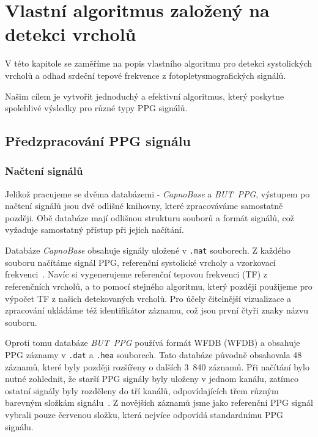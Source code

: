 \chapter{Vlastní algoritmus založený na detekci vrcholů}
\label{ch:VlastniAlg}
V této kapitole se zaměříme na popis vlastního algoritmu pro detekci systolických vrcholů a odhad srdeční tepové frekvence z fotopletysmografických signálů.

Našim cílem je vytvořit jednoduchý a efektivní algoritmus, který poskytne spolehlivé výsledky pro různé typy PPG signálů.

\section{Předzpracování PPG signálu}
\label{sec:alg_preproc}

\subsection*{Načtení signálů}
\label{sec:alg_load}
Jelikož pracujeme se dvěma databázemi - \emph{CapnoBase} a \emph{BUT~PPG}, výstupem po načtení signálů jsou dvě odlišné knihovny, které zpracováváme samostatně později.
Obě databáze mají odlišnou strukturu souborů a formát signálů, což vyžaduje samostatný přístup při jejich načítání.

Databáze \emph{CapnoBase} obsahuje signály uložené v \texttt{.mat} souborech.
Z každého souboru načítáme signál PPG, referenční systolické vrcholy a vzorkovací frekvenci~\cite{CapnoBase}.
Navíc si vygenerujeme referenční tepovou frekvenci (TF) z referenčních vrcholů, a to pomocí stejného algoritmu, který později použijeme pro výpočet TF z našich detekovaných vrcholů.
Pro účely čitelnější vizualizace a zpracování ukládáme též identifikátor záznamu, což jsou první čtyři znaky názvu souboru.

Oproti tomu databáze \emph{BUT~PPG} používá formát \acl{WFDB} (\acs{WFDB}) a obsahuje PPG záznamy v \texttt{.dat} a \texttt{.hea} souborech.
Tato databáze původně obsahovala 48 záznamů, které byly později rozšířeny o dalších 3~840 záznamů.
Při načítání bylo nutné zohlednit, že starší PPG signály byly uloženy v jednom kanálu, zatímco ostatní signály byly rozděleny do tří kanálů, odpovídajících třem různým barevným složkám signálu~\cite{BUT_PPG_database}.
Z novějších záznamů jsme jako referenční PPG signál vybrali pouze červenou složku, která nejvíce odpovídá standardnímu PPG signálu.

